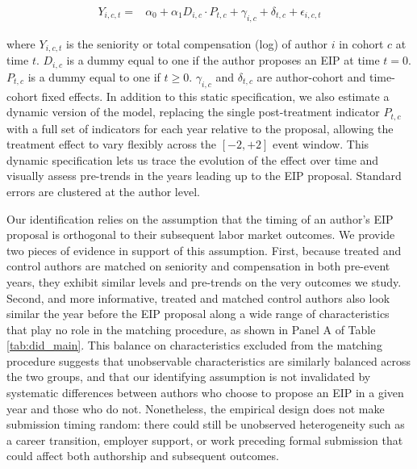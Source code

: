 \documentclass[No]{AEA}
\begin{document}
\begin{equation}
\begin{split}   
  Y_{i,c,t}  =& \alpha_0 + \alpha_1 D_{i,c} \cdot P_{t,c} + \gamma_{i,c} + \delta_{t,c} +  \epsilon_{i,c,t}  \label{eq:labor}
\end{split}
\end{equation}

where $Y_{i,c,t}$ is the seniority or total compensation (log) of author $i$ in cohort $c$ at time $t$. $D_{i,c}$ is a dummy equal to one if the author proposes an EIP at time $t=0$. $P_{t,c}$ is a dummy equal to one if $t\geq0$. $\gamma_{i,c}$ and $\delta_{t,c}$ are author-cohort and time-cohort fixed effects. In addition to this static specification, we also estimate a dynamic version of the model, replacing the single post-treatment indicator $P_{t,c}$ with a full set of indicators for each year relative to the proposal, allowing the treatment effect to vary flexibly across the $[-2,+2]$ event window. This dynamic specification lets us trace the evolution of the effect over time and visually assess pre-trends in the years leading up to the EIP proposal. Standard errors are clustered at the author level.

Our identification relies on the assumption that the timing of an author's EIP proposal is orthogonal to their subsequent labor market outcomes. We provide two pieces of evidence in support of this assumption. First, because treated and control authors are matched on seniority and compensation in both pre-event years, they exhibit similar levels and pre-trends on the very outcomes we study. Second, and more informative, treated and matched control authors also look similar the year before the EIP proposal along a wide range of characteristics that play no role in the matching procedure, as shown in Panel A of Table \ref{tab:did_main}. This balance on characteristics excluded from the matching procedure suggests that unobservable characteristics are similarly balanced across the two groups, and that our identifying assumption is not invalidated by systematic differences between authors who choose to propose an EIP in a given year and those who do not. Nonetheless, the empirical design does not make submission timing random: there could still be unobserved heterogeneity such as a career transition, employer support, or work preceding formal submission that could affect both authorship and subsequent outcomes.
\end{document}
